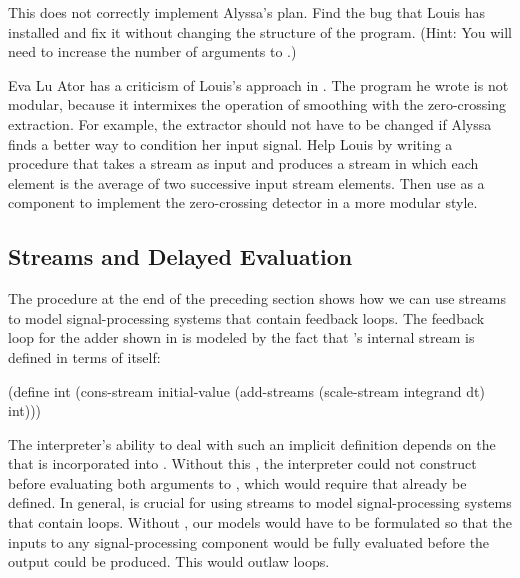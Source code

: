 \begin{exerciseGroup}
This does not correctly implement Alyssa's plan.  Find the bug that Louis has
installed and fix it without changing the structure of the program.  (Hint: You
will need to increase the number of arguments to .)

\label{Exercise 3.76}
 Eva Lu Ator has a criticism of
Louis's approach in .  The program he wrote is not modular,
because it intermixes the operation of smoothing with the zero-crossing
extraction.  For example, the extractor should not have to be changed if Alyssa
finds a better way to condition her input signal.  Help Louis by writing a
procedure  that takes a stream as input and produces a stream in
which each element is the average of two successive input stream elements.
Then use  as a component to implement the zero-crossing detector
in a more modular style.
\end{exerciseGroup}

\subsection{Streams and Delayed Evaluation}
\label{Section 3.5.4}

The  procedure at the end of the preceding section shows how we
can use streams to model signal-processing systems that contain feedback loops.
The feedback loop for the adder shown in  is modeled by the
fact that 's internal stream  is defined in terms of
itself:

\begin{codeBlock}
(define int
  (cons-stream
   initial-value
   (add-streams (scale-stream integrand dt)
                int)))
\end{codeBlock}

\noindent
The interpreter's ability to deal with such an implicit definition depends on
the  that is incorporated into .  Without this
, the interpreter could not construct  before evaluating
both arguments to , which would require that 
already be defined.  In general,  is crucial for using streams to
model signal-processing systems that contain loops.  Without , our
models would have to be formulated so that the inputs to any signal-processing
component would be fully evaluated before the output could be produced.  This
would outlaw loops.


